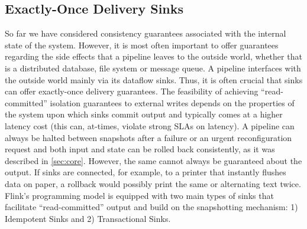 \subsection{Exactly-Once Delivery Sinks}
\label{sec:outputcommit}



So far we have considered consistency guarantees associated with the internal state of the system. However, it is most often important to offer guarantees regarding the side effects that a pipeline leaves to the outside world, whether that is a distributed database, file system or message queue. A pipeline interfaces with the outside world mainly via its dataflow sinks. Thus, it is often crucial that sinks can offer exactly-once delivery guarantees. The feasibility of achieving ``read-committed'' isolation guarantees to external writes depends on the properties of the system upon which sinks commit output and typically comes at a higher latency cost (this can, at-times, violate strong SLAs on latency). A pipeline can always be halted between snapshots after a failure or an urgent reconfiguration request and both input and state can be rolled back consistently, as it was described in \ref{sec:core}. However, the same cannot always be guaranteed about the output. If sinks are connected, for example, to a printer that instantly flushes data on paper, a rollback would possibly print the same or alternating text twice. Flink's programming model is equipped with two main types of sinks that facilitate ``read-committed'' output and build on the snapshotting mechanism: 1) Idempotent Sinks and 2) Transactional Sinks.



